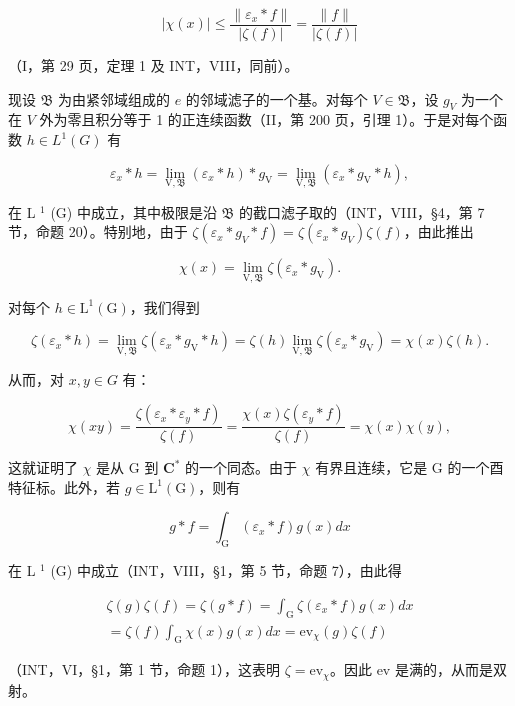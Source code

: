 \[
| \chi (x) | \leqslant \frac {\| \varepsilon_ {x} * f \|}{| \zeta (f) |} = \frac {\| f \|}{| \zeta (f) |}
\]

（I，第 29 页，定理 1 及 INT，VIII，同前）。

现设 \(\mathfrak{B}\) 为由紧邻域组成的 \(e\) 的邻域滤子的一个基。对每个 \(V \in \mathfrak{B}\)，设 \(g_V\) 为一个在 \(V\) 外为零且积分等于 1 的正连续函数（II，第 200 页，引理 1）。于是对每个函数 \(h \in L^1(G)\) 有

\[
\varepsilon_ {x} * h = \lim _ {\mathrm{V}, \mathfrak {B}} (\varepsilon_ {x} * h) * g _ {\mathrm{V}} = \lim _ {\mathrm{V}, \mathfrak {B}} (\varepsilon_ {x} * g _ {\mathrm{V}} * h),
\]

在 L \(^{1}\) (G) 中成立，其中极限是沿 \(\mathfrak{B}\) 的截口滤子取的（INT，VIII，§4，第 7 节，命题 20）。特别地，由于 \(\zeta(\varepsilon_x * g_V * f) = \zeta(\varepsilon_x * g_V)\zeta(f)\)，由此推出

\[
\chi (x) = \lim _ {\mathrm{V}, \mathfrak {B}} \zeta (\varepsilon_ {x} * g _ {\mathrm{V}}).
\]

对每个 \(h\in \mathrm{L}^1 (\mathrm{G})\)，我们得到

\[
\zeta (\varepsilon_ {x} * h) = \lim _ {\mathrm{V}, \mathfrak {B}} \zeta (\varepsilon_ {x} * g _ {\mathrm{V}} * h) = \zeta (h) \lim _ {\mathrm{V}, \mathfrak {B}} \zeta (\varepsilon_ {x} * g _ {\mathrm{V}}) = \chi (x) \zeta (h).
\]

从而，对 \(x, y \in G\) 有：

\[
\chi (x y) = \frac {\zeta (\varepsilon_ {x} * \varepsilon_ {y} * f)}{\zeta (f)} = \frac {\chi (x) \zeta (\varepsilon_ {y} * f)}{\zeta (f)} = \chi (x) \chi (y),
\]

这就证明了 \(\chi\) 是从 G 到 \(\mathbf{C}^*\) 的一个同态。由于 \(\chi\) 有界且连续，它是 G 的一个酉特征标。此外，若 \(g \in \mathrm{L}^{1}(\mathrm{G})\)，则有

\[
g * f = \int_ {\mathrm{G}} (\varepsilon_ {x} * f) g (x) d x
\]

在 L \(^{1}\) (G) 中成立（INT，VIII，§1，第 5 节，命题 7），由此得

\[
\begin{array}{c} \zeta (g) \zeta (f) = \zeta (g * f) = \int_ {\mathrm{G}} \zeta (\varepsilon_ {x} * f) g (x) d x \\ = \zeta (f) \int_ {\mathrm{G}} \chi (x) g (x) d x = \mathrm{ev} _ {\chi} (g) \zeta (f) \end{array}
\]

（INT，VI，§1，第 1 节，命题 1），这表明 \(\zeta = \mathrm{ev}_{\chi}\)。因此 ev 是满的，从而是双射。

